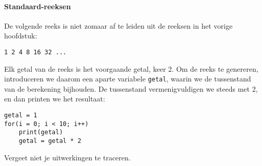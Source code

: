 \paragraph{Standaard-reeksen}

De volgende reeks is niet zomaar af te leiden uit de reeksen in het vorige hoofdstuk:

\texttt{1 2 4 8 16 32 ...}



%
%

Elk getal van de reeks is het voorgaande getal, keer 2. Om de reeks te genereren, introduceren we daarom een aparte variabele \texttt{getal}, waarin we de tussenstand van de berekening bijhouden. De tussenstand vermenigvuldigen we steeds met 2, en dan printen we het resultaat:

\begin{verbatim}
getal = 1
for(i = 0; i < 10; i++)
    print(getal)
    getal = getal * 2
\end{verbatim}

Vergeet niet je uitwerkingen te traceren.


